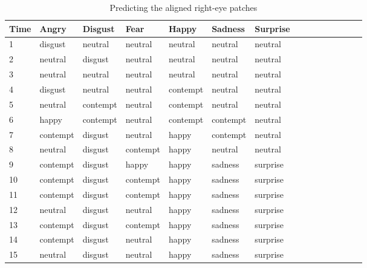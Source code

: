 \begin{table}[bp]
\centering
\caption{Predicting the aligned right-eye patches}
\label{table:predict_righteye}

\begin{tabular}{|*{15}{p{1.34cm}<{\centering}|}|}
\hline
Time & Angry &  Disgust  & Fear & Happy & Sadness & Surprise  \\
\hline
1 & disgust & neutral & neutral & neutral & neutral & neutral \\
2 & neutral & disgust & neutral & neutral & neutral & neutral \\
3 & neutral & neutral & neutral & neutral & neutral & neutral \\
4 & disgust & neutral & neutral & contempt & neutral & neutral \\
5 & neutral & contempt & neutral & contempt & neutral & neutral	\\
6 & happy & contempt & neutral & contempt & contempt & neutral \\
7 & contempt & disgust & neutral & happy & contempt & neutral \\
8 & neutral & disgust & contempt & happy & neutral & neutral \\
9 & contempt & disgust & happy & happy & sadness & surprise \\
10 & contempt & disgust & contempt & happy & sadness & surprise	\\
11 & contempt & disgust & contempt & happy & sadness & surprise \\
12 & neutral & disgust & neutral & happy & sadness & surprise \\
13 & contempt & disgust & contempt & happy & sadness & surprise \\
14 & contempt & disgust & neutral & happy & sadness & surprise \\
15 & neutral & disgust & neutral & happy & sadness & surprise\\

\hline
\end{tabular}
\end{table}


